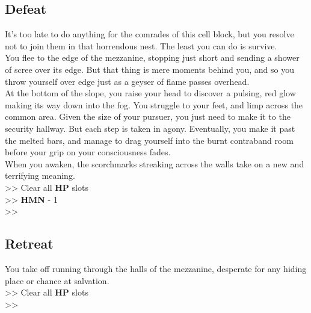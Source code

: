 \subsection*{Defeat}

It's too late to do anything for the comrades of this cell block, but you resolve not to join them in that horrendous nest. The least you can do is survive.\\

You flee to the edge of the mezzanine, stopping just short and sending a shower of scree over its edge. But that thing is mere moments behind you, and so you throw yourself over edge just as a geyser of flame passes overhead.\\

At the bottom of the slope, you raise your head to discover a pulsing, red glow making its way down into the fog. You struggle to your feet, and limp across the common area. Given the size of your pursuer, you just need to make it to the security hallway. But each step is taken in agony. Eventually, you make it past the melted bars, and manage to drag yourself into the burnt contraband room before your grip on your consciousness fades.\\

When you awaken, the scorchmarks streaking across the walls take on a new and terrifying meaning.\\

>> Clear all \textbf{HP} slots\\
>> \textbf{HMN} - 1\\
>> 

\subsection*{Retreat}

You take off running through the halls of the mezzanine, desperate for any hiding place or chance at salvation.\\

>> Clear all \textbf{HP} slots\\
>> 
